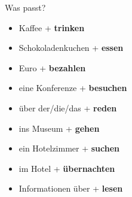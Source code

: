 \begin{syntax}{Was passt?}{}
\begin{itemize}
	\item Kaffee + \textbf{trinken} 
	\item Schokoladenkuchen + \textbf{essen}
	\item \fillhere Euro + \textbf{bezahlen}
	\item eine Konferenze + \textbf{besuchen}
	\item über der/die/das \ssthere + \textbf{reden}
	\item ins Museum + \textbf{gehen}
	\item ein Hotelzimmer + \textbf{suchen}
	\item im Hotel + \textbf{übernachten}
	\item Informationen über \fillhere + \textbf{lesen}
\end{itemize}
\end{syntax}
